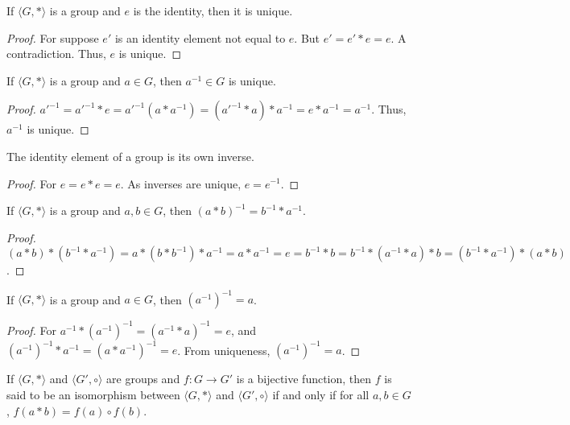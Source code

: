 \documentclass[crop=false,class=book,oneside]{standalone}
\begin{document}
        \begin{theorem}
        If $\langle G, * \rangle$ is a group and $e$ is the identity, then it is unique.
        \end{theorem}
        \begin{proof}
        For suppose $e'$ is an identity element not equal to $e$. But $e' = e'*e  = e$. A contradiction. Thus, $e$ is unique.
        \end{proof}
        \begin{theorem}
        If $\langle G, * \rangle$ is a group and $a\in G$, then $a^{-1}\in G$ is unique.
        \end{theorem}
        \begin{proof}
        $a'^{-1} = a'^{-1}*e = a'^{-1}(a*a^{-1}) = (a'^{-1}*a)*a^{-1} = e*a^{-1} = a^{-1}$. Thus, $a^{-1}$ is unique.
        \end{proof}
        \begin{corollary}
        The identity element of a group is its own inverse.
        \end{corollary}
        \begin{proof}
        For $e=e*e = e$. As inverses are unique, $e=e^{-1}$.
        \end{proof}
        \begin{theorem}
        If $\langle G,*\rangle$ is a group and $a,b\in G$, then $(a*b)^{-1} = b^{-1}*a^{-1}$.
        \end{theorem}
        \begin{proof}
        $(a*b)*(b^{-1}*a^{-1}) = a*(b*b^{-1})*a^{-1} = a*a^{-1} = e=b^{-1}*b=b^{-1}*(a^{-1}*a)*b=(b^{-1}*a^{-1})*(a*b)  $.
        \end{proof}
        \begin{theorem}
        If $\langle G,* \rangle$ is a group and $a\in G$, then $(a^{-1})^{-1} = a$.
        \end{theorem}
        \begin{proof}
        For $a^{-1}*(a^{-1})^{-1} = (a^{-1}* a)^{-1} = e$, and $(a^{-1})^{-1}*a^{-1} = (a*a^{-1})^{-1} = e$. From uniqueness, $(a^{-1})^{-1} = a$.
        \end{proof}
        \begin{definition}
        If $\langle G, * \rangle$ and $\langle G',\circ \rangle$ are groups and $f:G\rightarrow G'$ is a bijective function, then $f$ is said to be an isomorphism between $\langle G, * \rangle$ and $\langle G',\circ \rangle$ if and only if for all $a,b\in G$, $f(a*b) =f(a)\circ f(b)$.
        \end{definition}
\end{document}
